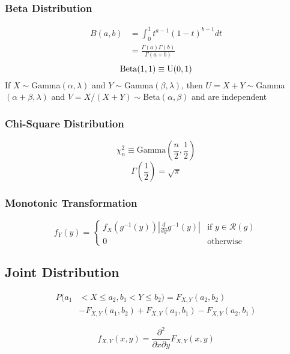 \documentclass{article}
\begin{document}
\begin{multicols}{2}
\subsubsection*{Beta Distribution}
\begin{equation*}
\begin{split}
 B(a,b) &= \int_{0}^{1}t^{a-1}(1-t)^{b-1}dt\\
 &= \frac{\Gamma(a)\Gamma(b)}{\Gamma(a+b)}
\end{split}
\end{equation*}
\begin{equation*}
 \text{Beta}(1,1) \equiv \text{U}(0,1)\\
\end{equation*}
If $X\sim$Gamma$(\alpha,\lambda)$ and $Y\sim$Gamma$(\beta,\lambda)$, then $U=X+Y \sim$Gamma$(\alpha+\beta, \lambda)$ and $V=X/(X+Y) \sim$Beta$(\alpha,\beta)$ and are independent

\subsubsection*{Chi-Square Distribution}
$$\chi^2_n \equiv \text{Gamma}\left(\frac{n}{2},\frac{1}{2}\right) $$
$$\Gamma(\frac{1}{2}) = \sqrt{\pi}$$
\subsubsection*{Monotonic Transformation}
\begin{equation*}
 f_Y(y) =\left\{\begin{array}{ll}
f_X(g^{-1}(y))\left|\frac{d}{dy}g^{-1}(y)\right| & \text{if } y \in \mathcal{R}(g)\\
0 & \text{otherwise}
\end{array}  \right.
\end{equation*}

\subsection{Joint Distribution}
\begin{equation*}
\begin{split}
 P(a_1 &< X \leq a_2, b_1 < Y \leq b_2) = F_{X,Y}(a_2,b_2)\\ &- F_{X,Y}(a_1,b_2) + F_{X,Y}(a_1,b_1) - F_{X,Y}(a_2,b_1)
\end{split}
\end{equation*}

\begin{equation*}
 f_{X,Y}(x,y) = \frac{\partial^2}{\partial x \partial y}F_{X,Y}(x,y)
\end{equation*}


\end{multicols}
\end{document}
